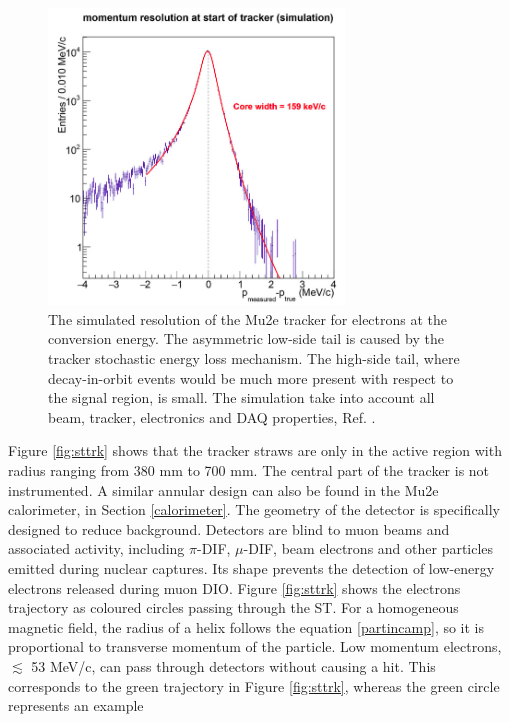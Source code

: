 \begin{figure}[!h]
    \centering
    \includegraphics[width =0.7\textwidth]{figures/png/Screenshot_20240330_104830.png}
    \caption{The simulated resolution of the Mu2e tracker for electrons at the
    conversion energy. The asymmetric low-side tail is caused by the tracker 
    stochastic energy loss mechanism. The high-side tail, where decay-in-orbit 
    events would be much more present with respect to the signal region, is small. 
    The simulation take into account all beam, tracker, electronics and DAQ 
    properties, Ref. \cite{bobbb}.}
    \label{fig:trkres}
    \end{figure}
Figure \ref{fig:sttrk} shows that the tracker straws are only 
in the active region with radius ranging from 380 mm to 700 mm. 
The central part of the tracker is not instrumented. A similar annular 
design can also be found in the Mu2e calorimeter, in Section \ref{calorimeter}. 
The geometry of the detector is specifically designed to reduce background. 
Detectors are blind to muon beams and associated activity, including $\pi$-DIF, 
$\mu$-DIF, beam electrons and other particles emitted during nuclear captures. 
Its shape prevents the detection of low-energy electrons released during muon DIO. 
Figure \ref{fig:sttrk} shows the electrons trajectory as coloured circles passing 
through the ST. For a homogeneous magnetic field, the radius of a 
helix follows the equation \ref{partincamp}, so it is proportional to transverse 
momentum of the particle. Low momentum electrons, $\lesssim$ 53 MeV/c, can pass 
through detectors without causing a hit. This corresponds to the green trajectory 
in Figure \ref{fig:sttrk}, whereas the green circle represents an example 
